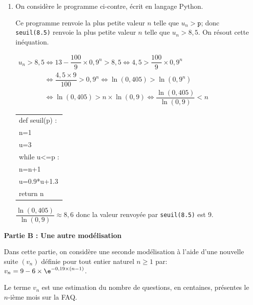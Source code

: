 \begin{enumerate}
donc la suite $(u_n)_{n\in\N*}$ est croissante.

\item On considère le programme ci-contre, écrit en langage Python.

\begin{minipage}{0.72\linewidth}



Ce programme renvoie la plus petite valeur $n$ telle que $u_n>\texttt{p}$; donc \texttt{seuil(8.5)} renvoie la plus petite valeur $n$ telle que $u_n>8,5$. On résout cette inéquation.

$\begin{gathered}u_n>8,5
\iff
13 -\dfrac{100}{9}\times 0,9^n > 8,5
\iff
4,5 > \dfrac{100}{9}\times 0,9^n\\
\phantom{u_n>8,5}
\iff
\dfrac{4,5\times 9}{100}> 0,9^n
\iff
\ln(0,405) > \ln \left (0,9^n\right )\\
\phantom{u_n>8,5}
\iff
\ln(0,405) >n \times \ln  (0,9)
\iff
\dfrac{\ln(0,405)}{\ln(0,9)} <n\end{gathered}$
\end{minipage}\hfill
\begin{minipage}{0.25\linewidth}
\renewcommand\arraystretch{0.9}
\begin{tabularx}{\linewidth}{|X|} \hline
def seuil(p) :\\
\qquad n=1\\
\qquad u=3\\
\qquad while u<=p :\\
\qquad  \qquad n=n+1\\
\qquad \qquad u=0.9*u+1.3 \\
\qquad return n\\ \hline
\end{tabularx}
\end{minipage}

$\dfrac{\ln(0,405)}{\ln(0,9)} \approx 8,6$ donc la valeur renvoyée par \texttt{seuil(8.5)} est 9.
\end{enumerate}

\bigskip

\textbf{Partie B : Une autre modélisation}

\medskip

Dans cette partie, on considère une seconde modélisation à l'aide d'une nouvelle
suite $\left(v_n\right)$ définie pour tout entier naturel $n \geqslant 1$ par:
$v_n = 9 - 6 \times \e^{-0,19\times(n - 1)}$.

Le terme $v_n$ est une estimation du nombre de questions, en centaines, présentes le $n$-ième mois sur la FAQ.

